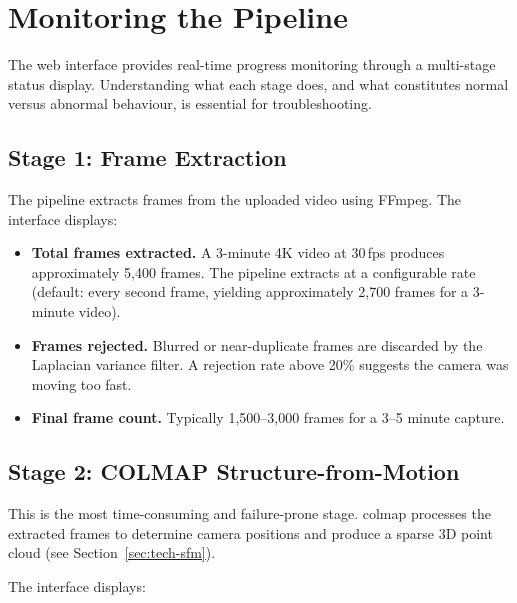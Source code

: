 \section{Monitoring the Pipeline}
\label{sec:proc-monitoring}

The web interface provides real-time progress monitoring through a multi-stage status display. Understanding what each stage does, and what constitutes normal versus abnormal behaviour, is essential for troubleshooting.

\subsection{Stage 1: Frame Extraction}

The pipeline extracts frames from the uploaded video using FFmpeg. The interface displays:

\begin{itemize}
  \item \textbf{Total frames extracted.} A 3-minute 4K video at 30\,fps produces approximately 5,400 frames. The pipeline extracts at a configurable rate (default: every second frame, yielding approximately 2,700 frames for a 3-minute video).
  \item \textbf{Frames rejected.} Blurred or near-duplicate frames are discarded by the Laplacian variance filter. A rejection rate above 20\% suggests the camera was moving too fast.
  \item \textbf{Final frame count.} Typically 1,500--3,000 frames for a 3--5 minute capture.
\end{itemize}

\subsection{Stage 2: COLMAP Structure-from-Motion}
\label{sec:proc-colmap}

This is the most time-consuming and failure-prone stage. \acrshort{colmap} processes the extracted frames to determine camera positions and produce a sparse 3D point cloud (see Section~\ref{sec:tech-sfm}).

The interface displays:

